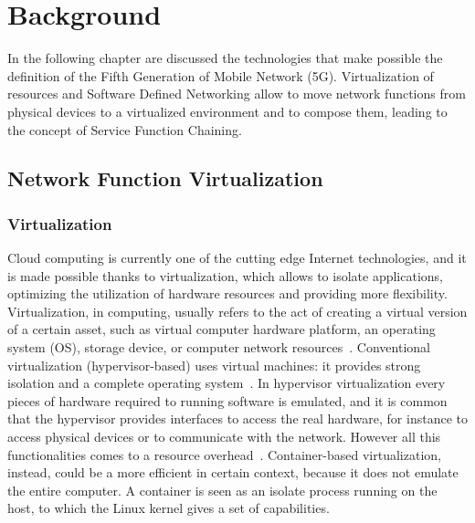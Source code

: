 \chapter{Background}
\label{chap:background}
In the following chapter are discussed the technologies that make possible the
definition of the Fifth Generation of Mobile Network (5G). Virtualization of
resources and Software Defined Networking allow to move network functions from
physical devices to a virtualized environment and to compose them, leading to
the concept of Service Function Chaining.

\section{Network Function Virtualization}

\subsection{Virtualization}
Cloud computing is currently one of the cutting edge Internet technologies, and
it is made possible thanks to virtualization, which allows to isolate
applications, optimizing the utilization of hardware resources and providing
more flexibility. Virtualization, in computing, usually refers to the act of
creating a virtual version of a certain asset, such as virtual computer hardware
platform, an operating system (OS), storage device, or computer network
resources~\cite{liu2014research}. Conventional virtualization
(hypervisor-based) uses virtual machines: it provides strong isolation and a
complete operating system~\cite{eder2016hypervisor}. In hypervisor
virtualization every pieces of hardware required to running software is
emulated, and it is common that the hypervisor provides interfaces to access
the real hardware, for instance to access physical devices or to communicate
with the network. However all this functionalities comes to a resource
overhead~\cite{scheepers2014virtualization}. Container-based virtualization,
instead, could be a more efficient in certain context, because it does not
emulate the entire computer. A container is seen as an isolate process running
on the host, to which the Linux kernel gives a set of capabilities.

